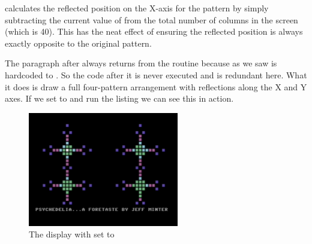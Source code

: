  calculates the reflected position on the X-axis for the pattern by simply subtracting the current value
of  from the total number of columns in the screen (which is 40). This has the neat effect of ensuring
the reflected position is always exactly opposite to the original pattern.

The paragraph after  always returns from the routine because as we saw  is
hardcoded to . So the code after it is never executed and is redundant here. What it does is draw a full four-pattern
arrangement with reflections along the X and Y axes. If we set  to  and run the
listing we can see this in action.


\begin{figure}[H]
    \centering
      \includegraphics[height=5cm]{src/listing_commentary/four_pattern.png}
  \caption*{The display with  set to }
\end{figure}


